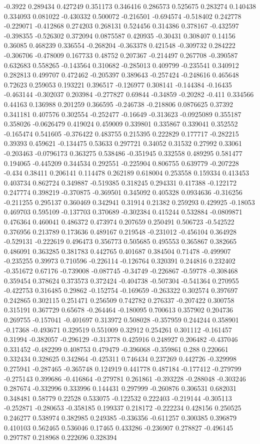 -0.3922 0.289434 0.427249 0.351173 0.346416 0.286573 0.525675 0.283274 0.140438 0.334093 0.081022 -0.430332 0.500072 -0.216501 -0.694574 -0.518402 0.242778 -0.229071 -0.412868 0.274203 0.268131 0.524456 0.314386 0.378167 -0.432597 -0.398355 -0.526302 0.372094 0.0875587 0.420935 -0.30431 0.308407 0.14156 0.36085 0.468239 0.336554 -0.268204 -0.363378 0.421548 -0.309732 0.284222 -0.306706 -0.478009 0.167733 0.48752 0.207367 -0.214497 0.267708 -0.390587 0.632683 0.558265 -0.143564 0.310682 -0.285013 0.409799 -0.235541 0.340912 0.282813 0.499707 0.472462 -0.205397 0.389643 -0.257424 -0.248616 0.465648 0.72623 0.259053 0.193221 0.396517 -0.126977 0.308141 -0.144384 -0.16435 -0.463144 -0.302037 0.203984 -0.277827 0.69844 -0.34859 -0.20282 -0.411 0.334566 0.44163 0.136988 0.201259 0.366595 -0.246738 -0.218806 0.0876625 0.37392 0.341181 0.407576 0.302554 -0.252477 -0.16649 -0.313623 -0.0925089 0.355187 0.358026 -0.0626479 0.419024 0.459009 0.339801 0.335867 0.339041 0.352552 -0.165474 0.541605 -0.376422 0.483755 0.215395 0.222829 0.177717 -0.282215 0.39393 0.459621 -0.134475 0.53633 0.297721 0.34052 0.31532 0.27992 0.33061 -0.203463 -0.0796173 0.363275 0.538486 -0.351945 0.332558 0.489295 0.581477 0.194065 -0.445209 0.344534 0.292551 -0.225904 0.806755 0.639779 -0.207228 -0.434 0.38411 0.206141 0.114478 0.262189 0.618004 0.253558 0.159334 0.413453 0.403734 0.862724 0.349887 -0.519385 0.318245 0.294331 0.417388 -0.122172 0.247774 0.398219 -0.370875 -0.369501 0.345092 0.405328 0.0934636 -0.316256 -0.211255 0.295137 0.360469 0.342941 0.31914 0.21382 0.259293 0.429925 -0.18053 0.469703 0.595109 -0.137703 0.370689 -0.302384 0.415244 0.532884 -0.0809871 0.476364 0.460041 0.486372 0.473974 0.207659 0.250491 0.506723 -0.542522 0.376956 0.213789 0.173636 0.489167 0.219548 -0.231012 -0.456104 0.364928 -0.529131 -0.222619 0.496473 0.356773 0.505685 0.495553 0.365867 0.382665 0.486091 0.363285 0.381783 0.442765 0.401687 0.384504 0.71478 -0.499907 -0.235255 0.39973 0.710596 -0.226114 -0.126764 0.320391 0.244816 0.232402 -0.351672 0.67176 -0.739008 -0.087745 -0.34749 -0.226867 -0.59778 -0.308468 0.359454 0.378624 0.373573 0.372424 -0.404738 -0.507304 -0.541364 0.270955 -0.422753 0.316485 0.29862 -0.152754 -0.169659 -0.263322 0.302574 0.397697 0.242865 0.302115 0.251471 0.256509 0.742782 0.276337 -0.207422 0.300758 0.315191 0.367729 0.65678 -0.264464 -0.180095 0.700613 0.357902 0.204736 0.269755 -0.157041 -0.401697 0.313972 0.508028 -0.357959 0.244244 0.358901 -0.17368 -0.493671 0.329519 0.551009 0.32912 0.254261 0.301112 -0.161457 0.31994 -0.382057 -0.296129 -0.313778 0.425916 0.248927 0.206482 -0.437046 0.331452 -0.482299 0.408753 0.479479 -0.396068 -0.359861 0.288 0.220661 0.332434 0.328625 0.342864 -0.425311 0.746434 0.237269 0.442726 -0.329998 0.275941 -0.287465 -0.365748 0.124919 0.441778 0.487184 -0.177412 -0.279799 -0.275143 0.399686 -0.416864 -0.279781 0.261861 -0.393228 -0.288048 -0.303246 0.287674 -0.332996 0.333996 0.144431 0.297999 -0.260876 0.306531 0.682031 0.348481 0.58779 0.22528 0.533075 -0.122532 0.222403 -0.219144 -0.305113 -0.252871 -0.280653 -0.358185 0.199337 0.218172 -0.222234 0.428156 0.250525 0.246277 0.538974 0.382985 0.249385 -0.336356 -0.611257 0.300385 0.396879 0.410103 0.562465 0.536046 0.17465 0.433286 -0.236907 0.278827 -0.496145 0.297787 0.218968 0.222696 0.328394 